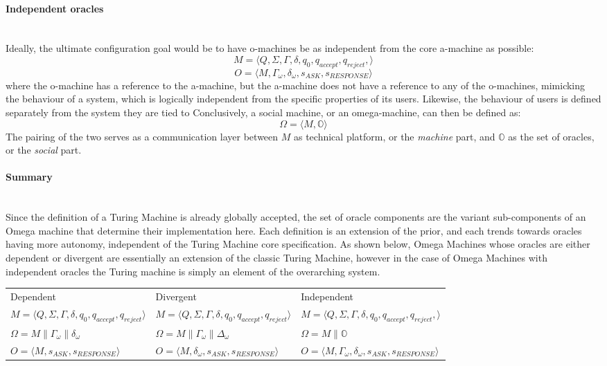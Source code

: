 \documentclass[12pt]{article}
\begin{document}
		\paragraph{Independent oracles}\hfill\\
			Ideally, the ultimate configuration goal would be to have o-machines be as independent from the core a-machine as possible:
			\[M = \langle Q, \Sigma, \Gamma, \delta, q_{0}, q_{accept}, q_{reject},\rangle\]
			\[O = \langle M, \Gamma_{\omega}, \delta_{\omega}, s_{ASK}, s_{RESPONSE} \rangle\]
			where the o-machine has a reference to the a-machine, but the a-machine does not have a reference to any of the o-machines, mimicking the behaviour of a system, which is logically independent from the specific properties of its users. 
			Likewise, the behaviour of users is defined separately from the system they are tied to
			Conclusively, a social machine, or an omega-machine, can then be defined as: \[\Omega = \langle M, \mathbb{O} \rangle \] The pairing of the two serves as a communication layer between $ M $ as technical platform, or the \textit{machine} part, and $\mathbb{O}$ as the set of oracles, or the \textit{social} part. 
	
		\paragraph{Summary}\hfill\\
				Since the definition of a Turing Machine is already globally accepted, the set of oracle components are the variant sub-components of an Omega machine that determine their implementation here.
				Each definition is an extension of the prior, and each trends towards oracles having more autonomy, independent of the Turing Machine core specification.
				As shown below, Omega Machines whose oracles are either dependent or divergent are essentially an extension of the classic Turing Machine, however in the case of Omega Machines with independent oracles the Turing machine is simply an element of the overarching system.
			\begin{table}[h!]
				\centering
				\scriptsize
				\begin{tabular}{>{\centering}m{2in} >{\centering}m{2in} >{\centering\arraybackslash}m{2in}}
					Dependent & Divergent & Independent \\
					$ M = \langle Q, \Sigma, \Gamma, \delta, q_{0}, q_{accept}, q_{reject} \rangle $  &  $M = \langle Q, \Sigma, \Gamma, \delta, q_{0}, q_{accept}, q_{reject} \rangle $  & $ M = \langle Q, \Sigma, \Gamma, \delta, q_{0}, q_{accept}, q_{reject},\rangle $ \\
					$\Omega = M \parallel\Gamma_{\omega} \parallel \delta_{\omega} $ & $ \Omega = M \parallel \Gamma_{\omega} \parallel \Delta_{\omega}$ & $ \Omega =  M \parallel \mathbb{O}  $ \\
					$ O = \langle M, s_{ASK}, s_{RESPONSE} \rangle $ & $ O = \langle M, \delta_{\omega}, s_{ASK}, s_{RESPONSE} \rangle $ & $ O = \langle M, \Gamma_{\omega}, \delta_{\omega}, s_{ASK}, s_{RESPONSE} \rangle $ \\
				\end{tabular}
			\end{table}
		
\end{document}
